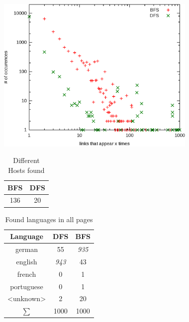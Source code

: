 \begin{frame}[c]
	\includegraphics[width=26em]{../crawler/src/main/resources/results/bfs/distLinks.eps} 
\end{frame}

\begin{frame}[c]

\begin{table}
\begin{tabular}{|c|c|}
\hline \textbf{BFS} & \textbf{DFS} \\ 
\hline 136 & 20 \\ 
\hline 
\end{tabular}
\caption{Different Hosts found}
\end{table}

\begin{table}
\begin{tabular}{|c|c|c|}
\hline \textbf{Language} & \textbf{DFS} & \textbf{BFS} \\ 
\hline german & 55 & \textit{935} \\ 
\hline english & \textit{943} & 43 \\ 
\hline french & 0 & 1 \\ 
\hline portuguese & 0 & 1 \\ 
\hline <unknown> & 2 & 20 \\ 
\hline $\sum$ & 1000 & 1000 \\
\hline 
\end{tabular}
\caption{Found languages in all pages}
\end{table}
\end{frame}

\begin{frame}[c]
	\begin{itemize}	
	\end{itemize}
\end{frame}